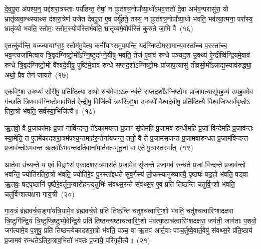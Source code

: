 दे॒व॒पु॒रा अ॑पश्य॒न्॒ यद्द॑शरा॒त्रस्ताः पर्यौ॑हन्त॒ तेषां॒ न कुत॑श्च॒नोपा᳚व्या॒धो॑\-ऽभव॒त्ततो॑ दे॒वा अभ॑व॒न्परासु॑रा॒ यो भ्रातृ॑व्यवा॒न्थ्स्याथ्स द॑शरा॒त्रेण॑ यजेत देवपु॒रा ए॒व पर्यू॑हते॒ तस्य॒ न कुत॑श्च॒नोपा᳚व्या॒धो भ॑वति॒ भव॑त्या॒त्मना॒ परा᳚स्य॒ भ्रातृ॑व्यो भवति॒ स्तोमः॒ स्तोम॒स्योप॑स्तिर्भवति॒ भ्रातृ॑व्यमे॒वोप॑स्तिं कुरुते जा॒मि वै~(१६)

ए॒तत्कु॑र्वन्ति॒ यज्ज्यायाꣳ॑स॒ꣴ॒ स्तोम॑मु॒पेत्य॒ कनी॑याꣳसमुप॒यन्ति॒ यद॑ग्निष्टोमसा॒मान्य॒वस्ता᳚च्च प॒रस्ता᳚च्च॒ भव॒न्त्यजा॑मित्वाय त्रि॒वृद॑ग्निष्टो॒मो᳚\-ऽग्नि॒ष्टुदा᳚ग्ने॒यीषु॑ भवति॒ तेज॑ ए॒वाव॑ रुन्धे पञ्चद॒श उ॒क्थ्य॑ ऐ॒न्द्रीष्वि॑न्द्रि॒यमे॒वाव॑ रुन्धे त्रि॒वृद॑ग्निष्टो॒मो वै᳚श्वदे॒वीषु॒ पुष्टि॑मे॒वाव॑ रुन्धे सप्तद॒शो᳚\-ऽग्निष्टो॒मः प्रा॑जाप॒त्यासु॑ तीव्रसो॒मो᳚\-ऽन्नाद्य॒स्याव॑रुद्ध्या॒ अथो॒ प्रैव तेन॑ जायते~(१७)

ए॒क॒वि॒ꣳ॒श उ॒क्थ्यः॑ सौ॒रीषु॒ प्रति॑ष्ठित्या॒ अथो॒ रुच॑मे॒वा\-ऽऽ\-त्मन्ध॑त्ते सप्तद॒शो᳚\-ऽग्निष्टो॒मः प्रा॑जाप॒त्यासू॑पह॒व्य॑ उपह॒वमे॒व ग॑च्छति त्रिण॒वाव॑ग्निष्टो॒माव॒भित॑ ऐ॒न्द्रीषु॒ विजि॑त्यै त्रयस्त्रि॒ꣳ॒श उ॒क्थ्यो॑ वैश्वदे॒वीषु॒ प्रति॑ष्ठित्यै विश्व॒जिथ्सर्व॑पृष्ठो\-ऽ तिरा॒त्रो भ॑वति॒ सर्व॑स्या॒भिजि॑त्यै॥~(१८)

{\anuvakamend[{प्रा॒जा॒प॒त्यो वा ए॒ष य॒ज्ञो यद्द॑शरा॒त्रस्त्रि॑क॒कुद्वा ए॒ता वै जा॑यत॒ एक॑त्रिꣳशच्च}]}%

ऋ॒तवो॒ वै प्र॒जाका॑माः प्र॒जां नावि॑न्दन्त॒ ते॑\-ऽकामयन्त प्र॒जाꣳ सृ॑जेमहि प्र॒जामव॑ रुन्धीमहि प्र॒जां वि॑न्देमहि प्र॒जाव॑न्तः स्या॒मेति॒ त ए॒तमे॑कादशरा॒त्रम॑पश्य॒न्तमाह॑र॒न्तेना॑यजन्त॒ ततो॒ वै ते प्र॒जाम॑सृजन्त प्र॒जामवा॑रुन्धत प्र॒जाम॑विन्दन्त प्र॒जाव॑न्तो\-ऽभव॒न्त ऋ॒तवो॑\-ऽभव॒न्तदा᳚र्त॒वाना॑मार्तव॒त्वमृ॑तू॒नां वा ए॒ते पु॒त्रास्तस्मा᳚त्~(१९)

आ॒र्त॒वा उ॑च्यन्ते॒ य ए॒वं वि॒द्वाꣳस॑ एकादशरा॒त्रमास॑ते प्र॒जामे॒व सृ॑जन्ते प्र॒जामव॑ रुन्धते प्र॒जां वि॑न्दन्ते प्र॒जाव॑न्तो भवन्ति॒ ज्योति॑रतिरा॒त्रो भ॑वति॒ ज्योति॑रे॒व पु॒रस्ता᳚द्दधते सुव॒र्गस्य॑ लो॒कस्यानु॑ख्यात्यै॒ पृष्ठ्यः॑ षड॒हो भ॑वति॒ षड्वा ऋ॒तवः॒ षट्पृ॒ष्ठानि॑ पृ॒ष्ठैरे॒वर्तून॒न्वारो॑हन्त्यृ॒तुभिः॑ संवथ्स॒रन्ते सं॑वथ्स॒र ए॒व प्रति॑ तिष्ठन्ति चतुर्वि॒ꣳ॒शो भ॑वति॒ चतु॑र्विꣳशत्यक्षरा गाय॒त्री~(२०)

गा॒य॒त्रं ब्र॑ह्मवर्च॒सङ्गा॑यत्रि॒यामे॒व ब्र॑ह्मवर्च॒से प्रति॑ तिष्ठन्ति चतुश्चत्वारि॒ꣳ॒शो भ॑वति॒ चतु॑श्चत्वारिꣳशदक्षरा त्रि॒ष्टुगि॑न्द्रि॒यं त्रि॒ष्टुप्त्रि॒ष्टुभ्ये॒वेन्द्रि॒ये प्रति॑ तिष्ठन्त्यष्टाचत्वारि॒ꣳ॒शो भ॑वत्य॒ष्टाच॑त्वारिꣳशदक्षरा॒ जग॑ती॒ जाग॑ताः प॒शवो॒ जग॑त्यामे॒व प॒शुषु॒ प्रति॑ तिष्ठन्त्येकादशरा॒त्रो भ॑वति॒ पञ्च॒ वा ऋ॒तव॑ आर्त॒वाः पञ्च॒र्तुष्वे॒वार्त॒वेषु॑ संवथ्स॒रे प्र॑ति॒ष्ठाय॑ प्र॒जामव॑ रुन्धते\-ऽतिरा॒त्राव॒भितो॑ भवतः प्र॒जायै॒ परि॑गृहीत्यै॥~(२१)

